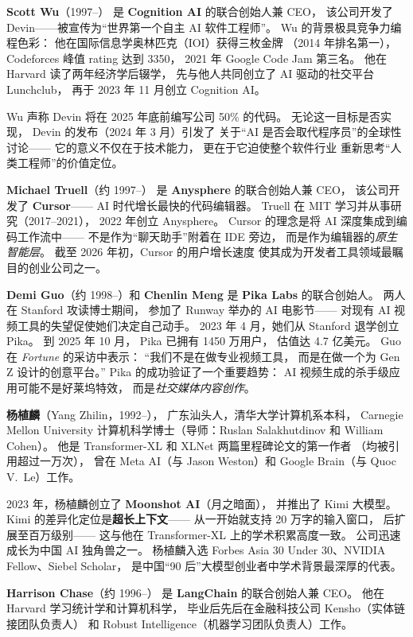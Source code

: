 \textbf{Scott Wu}（1997--）
是 \textbf{Cognition AI} 的联合创始人兼 CEO，
该公司开发了 Devin——被宣传为``世界第一个自主 AI 软件工程师''。
Wu 的背景极具竞争力编程色彩：
他在国际信息学奥林匹克（IOI）获得三枚金牌
（2014 年排名第一），
Codeforces 峰值 rating 达到 3350，
2021 年 Google Code Jam 第三名。
他在 Harvard 读了两年经济学后辍学，
先与他人共同创立了 AI 驱动的社交平台 Lunchclub，
再于 2023 年 11 月创立 Cognition AI。

Wu 声称 Devin 将在 2025 年底前编写公司 50\% 的代码。
无论这一目标是否实现，
Devin 的发布（2024 年 3 月）引发了
关于``AI 是否会取代程序员''的全球性讨论——
它的意义不仅在于技术能力，
更在于它迫使整个软件行业
重新思考``人类工程师''的价值定位。

\textbf{Michael Truell}（约 1997--）
是 \textbf{Anysphere} 的联合创始人兼 CEO，
该公司开发了 \textbf{Cursor}——
AI 时代增长最快的代码编辑器。
Truell 在 MIT 学习并从事研究（2017--2021），
2022 年创立 Anysphere。
Cursor 的理念是将 AI 深度集成到编码工作流中——
不是作为``聊天助手''附着在 IDE 旁边，
而是作为编辑器的\emph{原生智能层}。
截至 2026 年初，Cursor 的用户增长速度
使其成为开发者工具领域最瞩目的创业公司之一。

\textbf{Demi Guo}（约 1998--）和 \textbf{Chenlin Meng}
是 \textbf{Pika Labs} 的联合创始人。
两人在 Stanford 攻读博士期间，
参加了 Runway 举办的 AI 电影节——
对现有 AI 视频工具的失望促使她们决定自己动手。
2023 年 4 月，她们从 Stanford 退学创立 Pika。
到 2025 年 10 月，
Pika 已拥有 1450 万用户，
估值达 4.7 亿美元。
Guo 在 \emph{Fortune} 的采访中表示：
``我们不是在做专业视频工具，
而是在做一个为 Gen Z 设计的创意平台。''
Pika 的成功验证了一个重要趋势：
AI 视频生成的杀手级应用可能不是好莱坞特效，
而是\emph{社交媒体内容创作}。

\textbf{杨植麟}（Yang Zhilin，1992--），
广东汕头人，清华大学计算机系本科，
Carnegie Mellon University 计算机科学博士（导师：Ruslan Salakhutdinov 和 William Cohen）。
他是 Transformer-XL 和 XLNet 两篇里程碑论文的第一作者
（均被引用超过一万次），
曾在 Meta AI（与 Jason Weston）和 Google Brain（与 Quoc V.\ Le）工作。

2023 年，杨植麟创立了 \textbf{Moonshot AI}（月之暗面），
并推出了 Kimi 大模型。
Kimi 的差异化定位是\textbf{超长上下文}——
从一开始就支持 20 万字的输入窗口，
后扩展至百万级别——
这与他在 Transformer-XL 上的学术积累高度一致。
公司迅速成长为中国 AI 独角兽之一。
杨植麟入选 Forbes Asia 30 Under 30、NVIDIA Fellow、Siebel Scholar，
是中国``90 后''大模型创业者中学术背景最深厚的代表。

\textbf{Harrison Chase}（约 1996--）
是 \textbf{LangChain} 的联合创始人兼 CEO。
他在 Harvard 学习统计学和计算机科学，
毕业后先后在金融科技公司 Kensho（实体链接团队负责人）
和 Robust Intelligence（机器学习团队负责人）工作。

